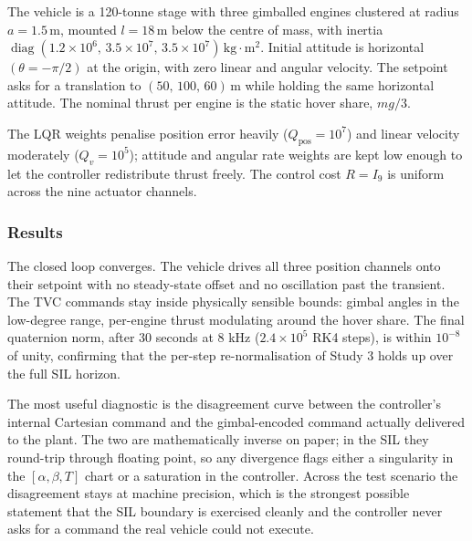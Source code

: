 \documentclass[11pt,a4paper]{article}
\begin{document}
The vehicle is a 120-tonne stage with three gimballed engines clustered at radius $a = 1.5\,\text{m}$, mounted $l = 18\,\text{m}$ below the centre of mass, with inertia $\operatorname{diag}(1.2\times10^6,\,3.5\times10^7,\,3.5\times10^7)\,\text{kg}\cdot\text{m}^2$. Initial attitude is horizontal $(\theta = -\pi/2)$ at the origin, with zero linear and angular velocity. The setpoint asks for a translation to $(50,\,100,\,60)\,\text{m}$ while holding the same horizontal attitude. The nominal thrust per engine is the static hover share, $mg/3$.

The LQR weights penalise position error heavily ($Q_{\text{pos}} = 10^7$) and linear velocity moderately ($Q_v = 10^5$); attitude and angular rate weights are kept low enough to let the controller redistribute thrust freely. The control cost $R = I_9$ is uniform across the nine actuator channels.

\subsubsection{Results}

The closed loop converges. The vehicle drives all three position channels onto their setpoint with no steady-state offset and no oscillation past the transient. The TVC commands stay inside physically sensible bounds: gimbal angles in the low-degree range, per-engine thrust modulating around the hover share. The final quaternion norm, after 30 seconds at 8 kHz ($2.4 \times 10^5$ RK4 steps), is within $10^{-8}$ of unity, confirming that the per-step re-normalisation of Study 3 holds up over the full SIL horizon.

The most useful diagnostic is the disagreement curve between the controller's internal Cartesian command and the gimbal-encoded command actually delivered to the plant. The two are mathematically inverse on paper; in the SIL they round-trip through floating point, so any divergence flags either a singularity in the $[\alpha,\beta,T]$ chart or a saturation in the controller. Across the test scenario the disagreement stays at machine precision, which is the strongest possible statement that the SIL boundary is exercised cleanly and the controller never asks for a command the real vehicle could not execute.
\end{document}
